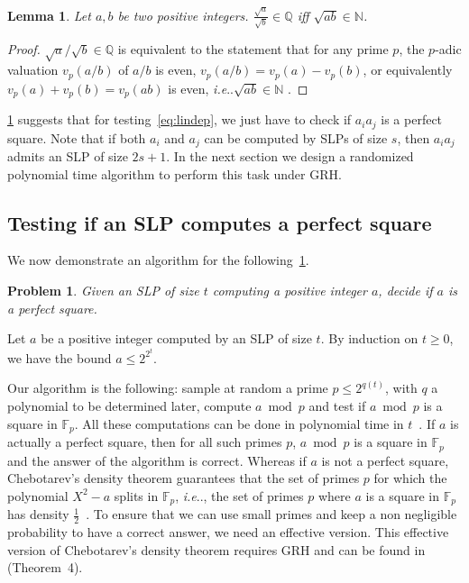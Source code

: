 \documentclass[a4paper, 11pt,dvipsnames]{article}
\makeatletter
\newtheorem{problem}{Problem}
\newtheorem{lemma}[theorem]{Lemma}
\DeclareRobustCommand\onedot{\futurelet\@let@token\@onedot}
\def\@onedot{\ifx\@let@token.\else.\null\fi\xspace}
\def\ie{\emph{i.e}\onedot} \def\Ie{\emph{I.e}\onedot}
\makeatother
\begin{document}
				\begin{lemma} Let $a,b$ be two positive integers.
				$ \frac{\sqrt{a}}{\sqrt{b}} \in \mathbb{Q}$ iff $\sqrt{ab} \in \mathbb{N}$.
				\label{lemma:sqrt_prod} \end{lemma}
			\begin{proof}
				$\sqrt{a}/\sqrt{b} \in \mathbb{Q}$ is equivalent to the statement that for any prime $p$, the $p$-adic valuation $v_p(a/b)$ of $a/b$ is even, $v_p(a/b) = v_p(a) - v_p(b)$, or equivalently $v_p(a) + v_p(b)  = v_p(ab) $ is even, \ie $\sqrt{ab} \in \mathbb{N}$ . 
			\end{proof}

			\cref{lemma:sqrt_prod} suggests that for testing~\cref{eq:lindep}, we just have to check if $a_ia_j$ is a perfect square.  Note that if both $a_i$ and $a_j$ can be computed by SLPs of size $s$, then $a_ia_j$ admits an SLP of size $2s+1$. In the next section we design a randomized polynomial time algorithm to perform this task under GRH.

			\subsection{Testing if an SLP computes a perfect square}

			We now demonstrate an algorithm for the following~\cref{pb:perfect_square}.

			\begin{problem}
				\label{pb:perfect_square}
				Given an SLP of size $t$ computing a positive integer $a$, decide if $a$ is a perfect square.
			\end{problem}

			Let $a$ be a positive integer computed by an SLP of size $t$. By induction on $t \ge 0$, we have the bound $a \le 2^{2 ^t}$.

			Our algorithm is the following: sample at random a prime $ p \le  2^{q(t)}$, with  $q$ a polynomial to be determined later, compute $a \bmod p$ and test if $a \bmod p$  is a square in $\mathbb{F}_p$. All these computations can be done in polynomial time in $t$~\cite{antbachshallit1996}. 
			If $a$ is actually a perfect square, then for all such primes $p$, $a \bmod p$ is a square in $\mathbb{F}_p$ and the answer of the algorithm is correct.
			 Whereas if $a$ is not a perfect square, Chebotarev's density theorem guarantees that the set of primes $p$ for which the polynomial $ X^2 -a$ splits in $\mathbb{F}_p$, \ie, the set of primes $p$
			where $a$ is a square in $\mathbb{F}_p$ has density $\frac{1}{2}$~\cite{stevenhagen1996chebotarev}. To ensure that we can use small primes and keep a non negligible probability to have a correct answer, we need an
			effective version. This effective version of Chebotarev's density theorem requires GRH and can be found in~\cite{serre1981quelques} (Theorem~4).    
\end{document}
